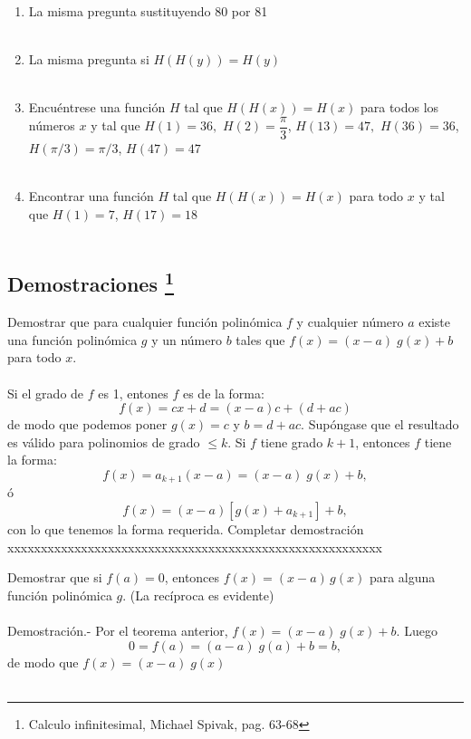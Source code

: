 \begin{ej}
\begin{enumerate}[\bfseries a)]
\begin{ej}
\begin{enumerate}[\bfseries a)]
\item  La misma pregunta sustituyendo 80 por 81\\\\

\item La misma pregunta si $H(H(y))=H(y)$\\\\

\item Encuéntrese una función $H$ tal que $H(H(x))=H(x)$ para todos los números $x$ \; y tal que $H(1)=36,$ $H(2)=\dfrac{\pi}{3}$, $H(13)=47,$ $H(36)=36$, $H(\pi / 3)=\pi / 3$, $H(47)=47$\\\\

\item Encontrar una función $H$ tal que $H(H(x))=H(x)$ para todo $x$ \; y tal que $H(1)=7$, $H(17)=18$\\\\
\end{enumerate}
\end{ej}


\end{enumerate}
\end{ej}



\subsection[Demostraciones]{Demostraciones \footnote{Calculo infinitesimal, Michael Spivak, pag. 63-68}}
\begin{teo}
Demostrar que para cualquier función polinómica $f$ y cualquier número $a$ existe una función polinómica $g$ \; y un número $b$ tales que $f(x)=(x-a) \; g(x)+b$ para todo $x$. \\\\
Si el grado de $f$ es 1, entones $f$ es de la forma: $$f(x)=cx+d=(x-a)c + (d+ac)$$
de modo que podemos poner $g(x)=c$ \; y \;$b=d+ac$. Supóngase que el resultado es válido para polinomios de grado $\leq k.$ Si $f$ tiene grado $k+1$, entonces $f$ tiene la forma: $$f(x) = a_{k+1} (x-a) = (x-a) \; g(x) + b,$$ ó  $$f(x) = (x-a)[g(x) + a_{k+1}] + b,$$ con lo que tenemos la forma requerida.
{\color{green} Completar demostración xxxxxxxxxxxxxxxxxxxxxxxxxxxxxxxxxxxxxxxxxxxxxxxxxxxxxxxx}
\end{teo}

\begin{teo}
Demostrar que si $f(a)=0$, entonces $f(x)=(x-a)\, g(x)$ para alguna función polinómica $g$. (La recíproca es evidente)\\\\
Demostración.- \; Por el teorema anterior, $f(x)=(x-a)\; g(x) + b.$ Luego $$0=f(a)=(a-a) \; g(a) + b = b,$$
de modo que $f(x) = (x-a) \; g(x)$\\\\
\end{teo}

